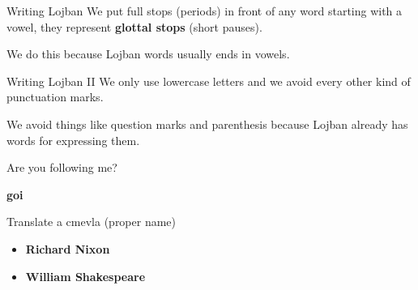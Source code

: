 \begin{frame}{Writing Lojban}
    We put full stops (periods) in front of any word starting with a vowel, they represent \textbf{glottal stops} (short pauses).

    We do this because Lojban words usually ends in vowels.
\end{frame}

\begin{frame}{Writing Lojban II}
    We only use lowercase letters and we avoid every other kind of punctuation marks.

    We avoid things like question marks and parenthesis because Lojban already has words for expressing them.
\end{frame}

\begin{frame}
    \centering
    \Large
    Are you following me?

    \pause
    \textbf{go\textquotesingle i}
\end{frame}

\begin{frame}{Translate a cmevla (proper name)}
    \begin{itemize}
        \item \textbf{Richard Nixon} 
        \item<3-> \textbf{William Shakespeare} 
    \end{itemize}
\end{frame}
